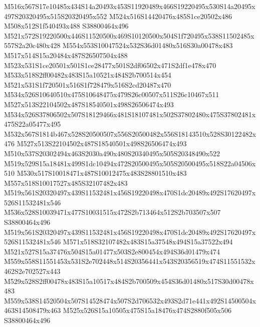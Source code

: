 \documentclass{article}
\begin{document}
\begin{multicols}{2}
M516x567S17e10485x434S14a20493x453S11920489x466S19220495x530S14a20495x497S20320495x515S20320495x552 M524x516S14420476x485S1ce20502x486 M508x512S1f540493x488 S38800464x496 M521x572S19220500x446S11520500x469S10120500x504S1f720495x538S11502485x557S2a20c480x428 M554x553S10047524x532S36d01480x516S30a00478x483 M517x514S15a20484x487S26507504x488 M523x531S1ce20501x501S1ce28477x501S2df06502x471S2df1e478x470 M533x518S2ff00482x483S15a10521x484S2b700514x454 M521x531S1f720501x516S1f728479x516S2cd20487x470 M534x526S10640510x475S10648475x479S26c00507x511S26c10467x511 M527x513S22104502x487S18540501x498S26506474x493 M534x526S37806502x507S18129466x481S18107481x502S37802480x475S37802481x475S22a05477x495 M532x567S1814b467x528S20500507x556S20500482x556S18143510x528S30122482x476 M527x513S22104502x487S18540501x498S26506474x493 M510x537S20302494x463S2030a490x480S20340495x505S20348490x522 M519x529S15a18481x499S1dc10494x472S20500495x505S20500495x518S22a04506x510 M530x517S10018471x487S10012475x483S28801510x483 M557x518S10017527x485S32107482x483 M519x561S20320497x439S11532481x456S19220498x470S1dc20489x492S17620497x526S11532481x546 M536x528S10039471x477S10031515x472S2b713464x512S2b703507x507 S38800464x496 M519x561S20320497x439S11532481x456S19220498x470S1dc20489x492S17620497x526S11532481x546 M571x518S32107482x483S15a37548x494S15a37522x494 M521x527S15a37476x504S15a01477x503S2e800454x494S36d01479x474 M559x558S11551453x531S2e702448x514S20356441x543S20356519x474S11551532x462S2e702527x443 M529x528S2ff00478x483S15a10517x484S2b700509x454S36d01480x517S30d00478x483 M559x538S14520504x507S14528474x507S2d706532x493S2d71e441x492S14500504x463S14508479x463 M525x526S15a10505x475S15a18476x474S2880f505x506 S38800464x496







\end{multicols}
\end{document}
